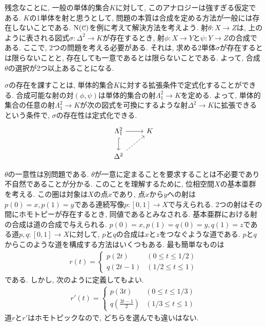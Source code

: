 \documentclass[uplatex, a4paper, 14Q, dvipdfmx]{jsreport}
\begin{document}
残念なことに, 一般の単体的集合$K$に対して, このアナロジーは強すぎる仮定である.
$K$の1単体を射と思うとして, 問題の本質は合成を定める方法が一般には存在しないことである. 
$\mathrm{N}(\mathcal{C})$を例に考えて解決方法を考えよう. 
射$\theta : X \to Z$は, 上のように表される図式$\sigma : \Delta^2 \to K$が存在するとき, 射$\phi : X \to Y$と$\psi : Y \to Z$の合成である. 
ここで, 2つの問題を考える必要がある. 
それは, 求める2単体$\sigma$が存在するとは限らないことと, 存在しても一意であるとは限らないことである. 
よって, 合成$\theta$の選択が2つ以上あることになる. 

$\sigma$の存在を課すことは, 単体的集合$K$に対する拡張条件で定式化することができる.
合成可能な射の対$(\phi,\psi)$は単体的集合の射$\Lambda^2_1 \to K$を定める.
よって, 単体的集合の任意の射$\Lambda^2_1 \to K$が次の図式を可換にするような射$\Delta^2 \to K$に拡張できるという条件で, $\sigma$の存在性は定式化できる. 
\[\begin{tikzcd}
	{\Lambda^2_1} & K \\
	{\Delta^2}
	\arrow[from=1-1, to=1-2]
	\arrow[hook, from=1-1, to=2-1]
	\arrow[dashed, from=2-1, to=1-2]
\end{tikzcd}\]

$\theta$の一意性は別問題である.
$\theta$が一意に定まることを要求することは不必要であり不自然であることが分かる. 
このことを理解するために, 位相空間$X$の基本亜群を考える. 
この圏は対象は$X$の点$x$であり, 点$x$から$y$への射は$p(0)=x, p(1)=y$である連続写像$p : [0,1] \to X$で与えられる. 
2つの射はその間にホモトピーが存在するとき, 同値であるとみなされる. 
基本亜群における射の合成は道の合成で与えられる. 
$p(0)=x, p(1)=q(0)=y, q(1)=z$である道$p,q : [0,1] \to X$に対して, $p$と$q$の合成は$x$と$z$をつなぐような道である. 
$p$と$q$からこのような道を構成する方法はいくつもある. 
最も簡単なものは 
\begin{align*}
  r(t)
  = \begin{cases}
    p(2t) & (0 \leq t \leq 1/2) \\
    q(2t-1) & (1/2 \leq t \leq 1)
  \end{cases}
\end{align*}
である. 
しかし, 次のように定義してもよい. 
\begin{align*}
  r'(t)
  = \begin{cases}
    p(3t) & (0 \leq t \leq 1/3) \\
    q(\frac{3t-1}{2}) & (1/3 \leq t \leq 1)
  \end{cases}
\end{align*}
道$r$と$r'$はホモトピックなので, どちらを選んでも違いはない.
\end{document}
